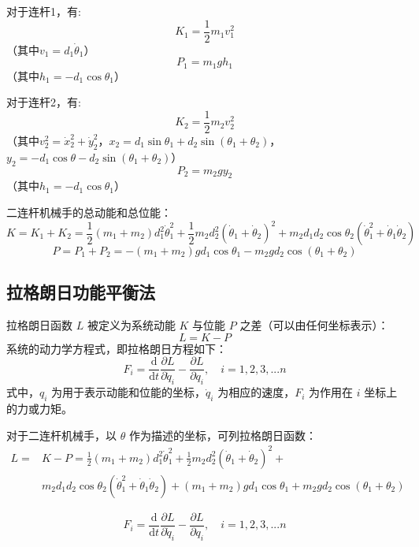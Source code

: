 对于连杆1，有:
$$
K_1 = \frac{1}{2}m_1v_1^2
$$
（其中$v_1 = d_1\dot{\theta}_1$）
$$
P_1 = m_1gh_1
$$
（其中$h_1 = -d_1\cos\theta_1$）

对于连杆2，有:
$$
K_2 = \frac{1}{2}m_2v_2^2
$$
（其中$v_2^2 = \dot{x}_2^2 + \dot{y}_2^2$，$x_2 = d_1\sin\theta_1 + d_2\sin(\theta_1+\theta_2)$，$y_2 = -d_1\cos\theta-d_2\sin(\theta_1+\theta_2)$）
$$
P_2 = m_2gy_2
$$
（其中$h_1 = -d_1\cos\theta_1$）

二连杆机械手的总动能和总位能：
$$
K = K_1 + K_2 = \frac{1}{2}(m_1 + m_2)d_1^2 \dot{\theta}_1^2 + \frac{1}{2}m_2 d_2^2 (\dot{\theta}_1 + \dot{\theta}_2)^2 + m_2 d_1 d_2 \cos\theta_2 (\dot{\theta}_1^2 + \dot{\theta}_1 \dot{\theta}_2)
$$
$$
P = P_1 + P_2 = -(m_1 + m_2) g d_1 \cos\theta_1 - m_2 g d_2 \cos(\theta_1 + \theta_2)
$$

\subsection{拉格朗日功能平衡法}

拉格朗日函数 $L$ 被定义为系统动能 $K$ 与位能 $P$ 之差（可以由任何坐标表示）：
$$L = K - P$$
系统的动力学方程式，即拉格朗日方程如下：
$$F_{i} = \frac{\mathrm{d}}{\mathrm{d}t}\frac{\partial L}{\partial\dot{q}_{i}} - \frac{\partial L}{\partial q_{i}}, \quad i = 1,2,3,...n$$
式中，$q_i$ 为用于表示动能和位能的坐标，$\dot{q}_{i}$ 为相应的速度，$F_i$ 为作用在 $i$ 坐标上的力或力矩。

对于二连杆机械手，以 $\theta$ 作为描述的坐标，可列拉格朗日函数：
$$
\begin{aligned}
    L = &K - P = \frac{1}{2}(m_{1}+m_{2})d_{1}^{2}\dot{\theta}_{1}^{2} + \frac{1}{2}m_{2}d_{2}^{2}(\dot{\theta}_{1}+\dot{\theta}_{2})^{2} +\\
    &m_{2}d_{1}d_{2}\cos\theta_{2}(\dot{\theta}_{1}^{2}+\dot{\theta}_{1}\dot{\theta}_{2}) + (m_{1}+m_{2})g d_{1}\cos\theta_{1} + m_{2}g d_{2}\cos(\theta_{1}+\theta_{2})
\end{aligned}
$$

$$F_{i} = \frac{\mathrm{d}}{\mathrm{d}t}\frac{\partial L}{\partial\dot{q}_{i}} - \frac{\partial L}{\partial q_{i}}, \quad i = 1,2,3,...n$$


